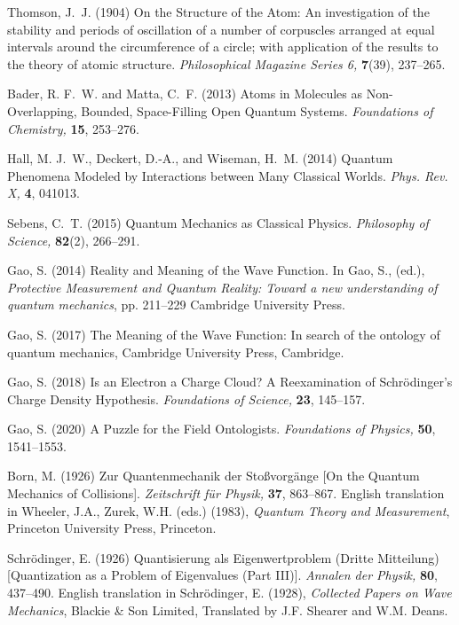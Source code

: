 \documentclass[onecolumn,secnumarabic,amsmath,amssymb,balancelastpage,nofootinbib]{article}
\begin{document}
\begin{thebibliography}{100}

Thomson, J.~J. (1904)
On the Structure of the Atom: An investigation of the stability and periods of
  oscillation of a number of corpuscles arranged at equal intervals around the
  circumference of a circle; with application of the results to the theory of
  atomic structure.
{\em Philosophical Magazine Series 6,} {\bf 7}(39), 237--265.

Bader, R. F.~W. and Matta, C.~F. (2013)
Atoms in Molecules as Non-Overlapping, Bounded, Space-Filling Open Quantum
  Systems.
{\em Foundations of Chemistry,} {\bf 15}, 253--276.

Hall, M. J.~W., Deckert, D.-A., and Wiseman, H.~M. (2014)
Quantum Phenomena Modeled by Interactions between Many Classical Worlds.
{\em Phys. Rev. X,} {\bf 4}, 041013.

Sebens, C.~T. (2015)
Quantum Mechanics as Classical Physics.
{\em Philosophy of Science,} {\bf 82}(2), 266--291.

Gao, S. (2014)
Reality and Meaning of the Wave Function.
In Gao, S., (ed.), \emph{Protective Measurement and Quantum Reality: Toward a
  new understanding of quantum mechanics},  pp. 211--229 Cambridge University
  Press.

Gao, S. (2017)
The Meaning of the Wave Function: In search of the ontology of quantum
  mechanics,
Cambridge University Press, Cambridge.

Gao, S. (2018)
Is an Electron a Charge Cloud? A Reexamination of Schr\"{o}dinger's Charge
  Density Hypothesis.
{\em Foundations of Science,} {\bf 23}, 145--157.

Gao, S. (2020)
A Puzzle for the Field Ontologists.
{\em Foundations of Physics,} {\bf 50}, 1541--1553.

Born, M. (1926)
Zur Quantenmechanik der Sto{\ss}vorg\"{a}nge [On the Quantum Mechanics of
  Collisions].
{\em Zeitschrift f\"{u}r Physik,} {\bf 37}, 863--867.
English translation in Wheeler, J.A., Zurek, W.H. (eds.) (1983),
  \textit{Quantum Theory and Measurement}, Princeton University Press,
  Princeton.

Schr{\"o}dinger, E. (1926)
Quantisierung als Eigenwertproblem (Dritte Mitteilung) [Quantization as a
  Problem of Eigenvalues (Part III)].
{\em Annalen der Physik,} {\bf 80}, 437--490.
English translation in Schr{\"o}dinger, E. (1928), \textit{Collected Papers on
  Wave Mechanics}, Blackie \& Son Limited, Translated by J.F. Shearer and W.M.
  Deans.


\end{thebibliography}
\end{document}
